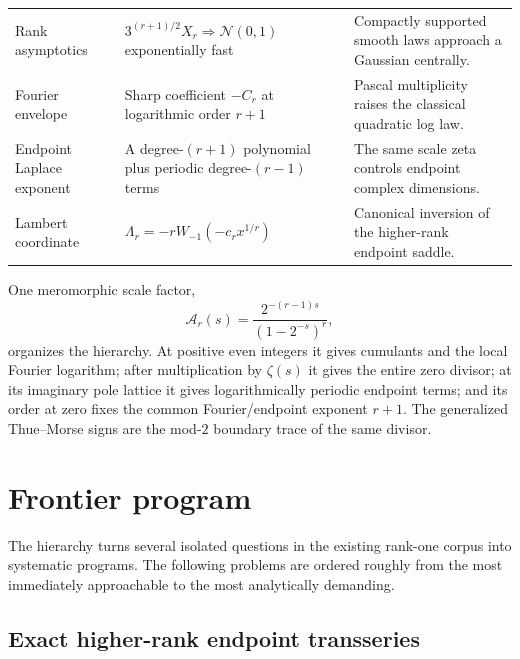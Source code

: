 \documentclass[11pt,a4paper]{article}
\theoremstyle{frontier}
\theoremstyle{definition}
\begin{document}
\begin{longtable}{@{}>{\raggedright\arraybackslash}p{}>{\raggedright\arraybackslash}p{}>{\raggedright\arraybackslash}p{}@{}}
Rank asymptotics
& $3^{(r+1)/2}X_r\Rightarrow\mathcal N(0,1)$ exponentially fast
& Compactly supported smooth laws approach a Gaussian centrally.\\

Fourier envelope
& Sharp coefficient $-C_r$ at logarithmic order $r+1$
& Pascal multiplicity raises the classical quadratic log law.\\

Endpoint Laplace exponent
& A degree-$(r+1)$ polynomial plus periodic degree-$(r-1)$ terms
& The same scale zeta controls endpoint complex dimensions.\\

Lambert coordinate
& $\Lambda_r=-rW_{-1}(-c_rx^{1/r})$
& Canonical inversion of the higher-rank endpoint saddle.\\
\bottomrule
\end{longtable}

\begin{resultbox}
One meromorphic scale factor,
\[
 \mathcal A_r(s)=\frac{2^{-(r-1)s}}{(1-2^{-s})^r},
\]
organizes the hierarchy.  At positive even integers it gives cumulants and the local Fourier logarithm; after multiplication by $\zeta(s)$ it gives the entire zero divisor; at its imaginary pole lattice it gives logarithmically periodic endpoint terms; and its order at zero fixes the common Fourier/endpoint exponent $r+1$.  The generalized Thue--Morse signs are the mod-$2$ boundary trace of the same divisor.
\end{resultbox}

\section{Frontier program}\label{sec:frontier-program}

The hierarchy turns several isolated questions in the existing rank-one corpus into systematic programs.  The following problems are ordered roughly from the most immediately approachable to the most analytically demanding.

\subsection{Exact higher-rank endpoint transseries}
\end{document}
